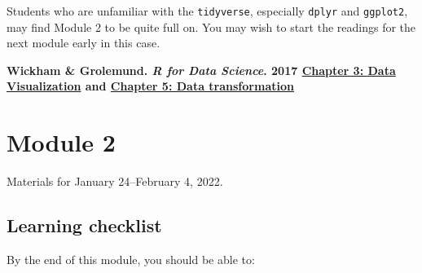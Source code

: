 \documentclass[
  openany]{book}
\newenvironment{yellowbox}{
  \definecolor{shadecolor}{rgb}{254,187,67}  %
  \color{black}
  \begin{shaded}}
 {\end{shaded}}
\begin{document}
Students who are unfamiliar with the \texttt{tidyverse}, especially \texttt{dplyr} and \texttt{ggplot2}, may find Module 2 to be quite full on. You may wish to start the readings for the next module early in this case.

\textbf{Wickham \& Grolemund. \emph{R for Data Science}. 2017 \href{https://r4ds.had.co.nz/data-visualisation.html}{Chapter 3: Data Visualization} and \href{https://r4ds.had.co.nz/transform.html}{Chapter 5: Data transformation}}

\hypertarget{m2}{%
\chapter{Module 2}\label{m2}}

\begin{yellowbox}
Materials for January 24--February 4, 2022.

\end{yellowbox}

\hypertarget{learning-checklist-1}{%
\section{Learning checklist}\label{learning-checklist-1}}

By the end of this module, you should be able to:
\end{document}
